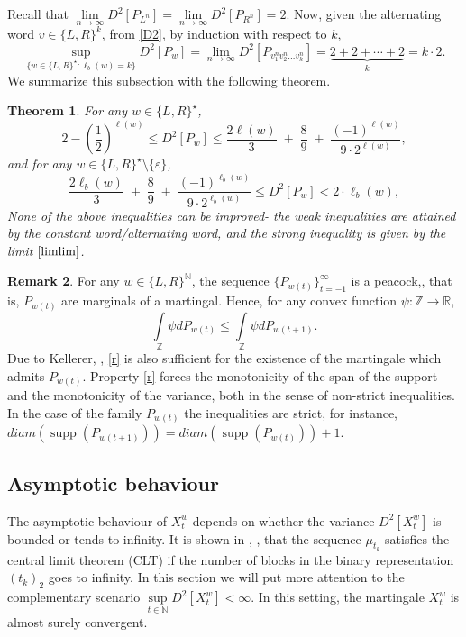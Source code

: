 \documentclass[10pt]{amsart}
\newtheorem{theorem}{Theorem}
\theoremstyle{definition}
\newtheorem{remark}[theorem]{Remark}
\numberwithin{equation}{section}
\newcommand{\eps}{\varepsilon}
\newcommand{\N}{\mathbb{N}}
\newcommand{\Z}{\mathbb{Z}}
\newcommand{\R}{\mathbb{R}}
\newcommand{\supp}{\operatorname{supp}}
\begin{document}
Recall that $\lim\limits_{n\to\infty}D^2[P_{L^n}]=\lim\limits_{n\to\infty}D^2[P_{R^n}]=2$. Now, given the alternating word $v\in\{L,R\}^k$, from \eqref{D2}, by induction with respect to $k$,
\begin{equation}\label{limlim}
\sup\limits_{\{w\in \{L,R\}^\star \colon \ell_b(w)=k\}}D^2[P_w]=\lim\limits_{n\to\infty} D^2[P_{v_1^nv_2^n\dots v_k^n }]=\underbrace{2 + 2 + \cdots + 2}_{k}=k\cdot 2.
\end{equation}
We summarize this subsection with the following theorem.
\begin{theorem}\label{WAR}For any $w\in\{L,R\}^\star$,
$$2-(\frac{1}{2})^{\ell(w)}\leq D^2[P_w]\leq \frac{2\ell(w)}{3} \;+\; \frac{8}{9} \;+\; \frac{(-1)^{\ell(w)}}{9\cdot 2^{\ell(w)}},$$and for any $w\in\{L,R\}^\star\setminus\{\eps\}$,
$$ \frac{2\ell_b(w)}{3} \;+\; \frac{8}{9} \;+\; \frac{(-1)^{\ell_b(w)}}{9\cdot 2^{\ell_b(w)}}\leq D^2[P_w]< 2\cdot \ell_b(w),$$
None of the above inequalities can be improved- the weak inequalities are attained by the constant word/alternating word, and the strong inequality is given by the limit $\eqref{limlim}$. 
\end{theorem}
\begin{remark}
 For any $w\in\{L,R\}^\N$, the sequence $\{P_{w(t)}\}_{t=-1}^{\infty}$ is a peacock,\cite{Hirsch}, that is, $P_{w(t)}$ are marginals of a martingal. Hence, for any convex function $\psi\colon\Z\to\R$,  
\begin{equation}\label{r}\textstyle \int\limits_{\Z}\psi d P_{w(t)}\leq \int\limits_{\Z}\psi d P_{w(t+1)}. \end{equation} 
Due to Kellerer, \cite{Kellerer}, \eqref{r} is also sufficient for the existence of the  martingale which admits $P_{w(t)}$. Property \eqref{r} forces the monotonicity of the span of the support and the monotonicity of the variance, both in the sense of non-strict inequalities. In the case of the family $P_{w(t)}$ the inequalities are strict, for instance, $diam(\supp(P_{w(t+1)}))=diam(\supp(P_{w(t)}))+1$. 
\end{remark}
\subsection{Asymptotic behaviour} 
The asymptotic behaviour of $X^w_t$  depends on whether the variance $D^2[X^w_t]$ is bounded or tends to infinity. It is shown in \cite{Hosten}, \cite{sw2023}, that the sequence $\mu_{t_k}$ satisfies the central limit theorem (CLT)  if the number of blocks in the binary representation $(t_k)_2$ goes to infinity. In this section we will put more attention to the complementary  scenario $\sup\limits_{t\in\N}D^2[X^w_t]<\infty$. In this setting, the martingale $X^w_t$ is almost surely convergent. 
\end{document}
